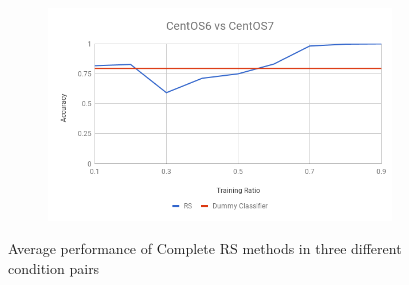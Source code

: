 \documentclass[10pt, conference, compsocconf]{IEEEtran}
\begin{document}
\begin{figure}[h!]
\begin{subfigure}[b]{0.8\linewidth}
        \end{subfigure}
        \begin{subfigure}[b]{0.8\linewidth}
                \includegraphics[width=\columnwidth]{figures/ALS/RS-ALS-6vs7-PFS}
        \end{subfigure}
        \caption{Average performance of Complete RS methods in three different condition pairs}
        \label{fig:RS method}
\end{figure}
\end{document}
